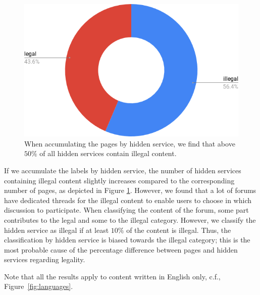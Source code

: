 \iflncs
  \begin{figure}[H]
    \centering
    \includegraphics[width=0.6\linewidth]{images/legalByHost.png}
    \caption{When accumulating the pages by hidden service, we find that above $50\%$ of all hidden services contain illegal content.}
    \label{fig:legalByHost}
  \end{figure}
\fi

If we accumulate the labels by hidden service, the number of hidden services containing illegal content slightly increases compared to the corresponding number of pages, as depicted in Figure \ref{fig:legalByHost}.
However, we found that a lot of forums have dedicated threads for the illegal content to enable users to choose in which discussion to participate. When classifying the content of the forum, some part contributes to the legal and some to the illegal category. However, we classify the hidden service as illegal if at least $10\%$ of the content is illegal. Thus, the classification by hidden service is biased towards the illegal category; this is the most probable cause of the percentage difference between pages and hidden services regarding legality.


Note that all the results apply to content written in English only, c.f., Figure~\ref{fig:languages}.


